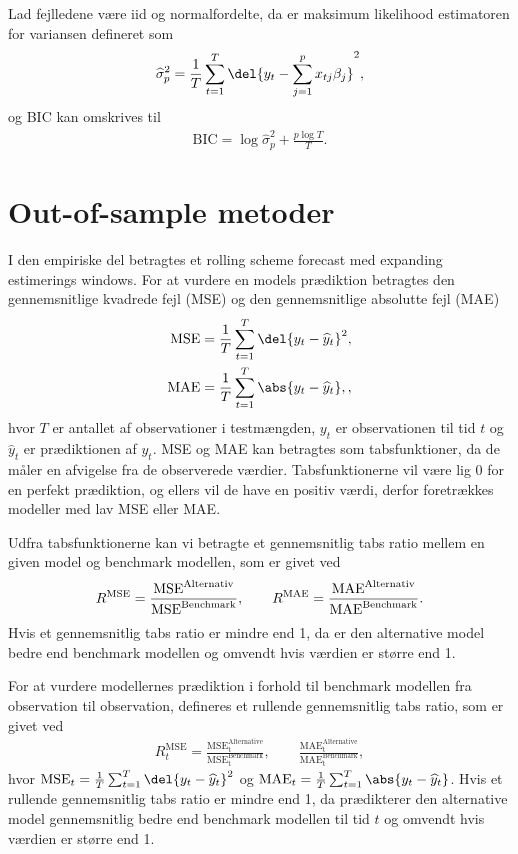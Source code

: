 Lad fejlledene være iid og normalfordelte, da er maksimum likelihood estimatoren for variansen defineret som
\begin{align*}
\widehat{\sigma}_p^2 = \frac{1}{T} \sum_{t=1}^{T} \del{y_t - \sum_{j=1}^p x_{tj}\beta_j}^2,
\end{align*}
og BIC kan omskrives til
\begin{align*}
\text{BIC} = \log \widehat{\sigma}^2_p + \frac{p \log T}{T}.
\end{align*}

\section{Out-of-sample metoder}
I den empiriske del betragtes et rolling scheme forecast med expanding estimerings windows.
For at vurdere en models prædiktion betragtes den gennemsnitlige kvadrede fejl (MSE) og den gennemsnitlige absolutte fejl (MAE)
\begin{align}
\text{MSE} & =  \frac{1}{T} \sum_{t=1}^{T} \del{y_{t} - \widehat{y}_{t}}^2 \label{eq:mse}, \\
\text{MAE} & =  \frac{1}{T} \sum_{t=1}^{T} \abs{y_{t} - \widehat{y}_{t}}, \label{eq:mae} ,
\end{align} 
hvor $T$ er antallet af observationer i testmængden, $y_{t}$ er observationen til tid $t$ og $\widehat{y}_{t}$ er prædiktionen af $y_{t}$.
MSE og MAE kan betragtes som tabsfunktioner, da de måler en afvigelse fra de observerede værdier.
Tabsfunktionerne vil være lig 0 for en perfekt prædiktion, og ellers vil de have en positiv værdi, derfor foretrækkes modeller med lav MSE eller MAE.

Udfra tabsfunktionerne kan vi betragte et gennemsnitlig tabs ratio mellem en given model og benchmark modellen, som er givet ved
\begin{align*}
R^{\text{\text{MSE}}} = \frac{\text{MSE}^{\text{Alternativ}}}{\text{MSE}^{\text{Benchmark}}}, \qquad R^{\text{MAE}} = \frac{\text{MAE}^{\text{Alternativ}}}{\text{MAE}^{\text{Benchmark}}}.
\end{align*} 
Hvis et gennemsnitlig tabs ratio er mindre end 1, da er den alternative model bedre end benchmark modellen og omvendt hvis værdien er større end 1. 

For at vurdere modellernes prædiktion i forhold til benchmark modellen fra observation til observation, defineres et rullende gennemsnitlig tabs ratio, som er givet ved
\begin{align*}
R_{t}^\text{MSE} =\frac{\text{MSE}_\text{t}^\text{Alternative}}{\text{MSE}_\text{t}^\text{Benchmark}}, \qquad\frac{\text{MAE}_\text{t}^\text{Alternative}}{\text{MAE}_\text{t}^\text{Benchmark}},
\end{align*}
hvor $\text{MSE}_t = \frac{1}{T} \sum_{t =1}^{T} \del{y_t - \widehat{y}_t}^2$ og $\text{MAE}_t = \frac{1}{T} \sum_{t = 1}^{T} \abs{y_t - \widehat{y}_t}$.
Hvis et rullende gennemsnitlig tabs ratio er mindre end 1, da prædikterer den alternative model gennemsnitlig bedre end benchmark modellen til tid \(t\) og omvendt hvis værdien er større end 1.


